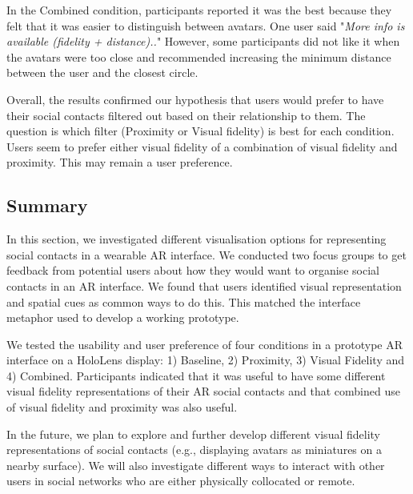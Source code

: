 In the Combined condition, participants reported it was the best because they felt that it was easier to distinguish between avatars. One user said "\textit{More info is available (fidelity + distance)..}"
However, some participants did not like it when the avatars were too close and recommended increasing the minimum distance between the user and the closest circle.

Overall, the results confirmed our hypothesis that users would prefer to have their social contacts filtered out based on their relationship to them. The question is which filter (Proximity or Visual fidelity) is best for each condition. Users seem to prefer either visual fidelity of a combination of visual fidelity and proximity. This may remain a user preference. 

\subsection{Summary}

In this section, we investigated different visualisation options for representing social contacts in a wearable AR interface. We conducted two focus groups to get feedback from potential users about how they would want to organise social contacts in an AR interface. We found that users identified visual representation and spatial cues as common ways to do this. This matched the interface metaphor used to develop a working prototype.

We tested the usability and user preference of four conditions in a prototype AR interface on a HoloLens display: 1) Baseline, 2) Proximity, 3) Visual Fidelity and 4) Combined. Participants indicated that it was useful to have some different visual fidelity representations of their AR social contacts and that combined use of visual fidelity and proximity was also useful.

In the future, we plan to explore and further develop different visual fidelity representations of social contacts (e.g., displaying avatars as miniatures on a nearby surface). We will also investigate different ways to interact with other users in social networks who are either physically collocated or remote.
